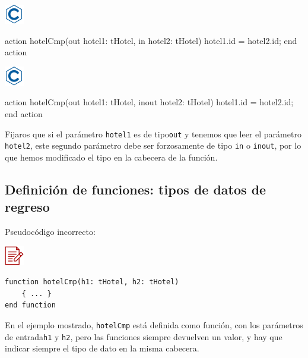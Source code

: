 \documentclass[
]{book}
\newenvironment{Shaded}{\begin{snugshade}}{\end{snugshade}}
\newcommand{\NormalTok}[1]{#1}
\begin{document}
\includegraphics{./img/c.png}

\begin{Shaded}
\begin{Highlighting}[]
\NormalTok{action hotelCmp(out hotel1: tHotel, in hotel2: tHotel)}
\NormalTok{    hotel1.id = hotel2.id;}
\NormalTok{end action}
\end{Highlighting}
\end{Shaded}

\includegraphics{./img/c.png}

\begin{Shaded}
\begin{Highlighting}[]
\NormalTok{action hotelCmp(out hotel1: tHotel, inout hotel2: tHotel)}
\NormalTok{    hotel1.id = hotel2.id;}
\NormalTok{end action}
\end{Highlighting}
\end{Shaded}

Fijaros que si el parámetro \texttt{hotel1} es de tipo\texttt{out} y tenemos que leer el parámetro \texttt{hotel2}, este segundo parámetro debe ser forzosamente de tipo \texttt{in} o \texttt{inout}, por lo que hemos modificado el tipo en la cabecera de la función.

\hypertarget{definiciuxf3n-de-funciones-tipos-de-datos-de-regreso}{%
\subsection{Definición de funciones: tipos de datos de regreso}\label{definiciuxf3n-de-funciones-tipos-de-datos-de-regreso}}

Pseudocódigo incorrecto:

\includegraphics{./img/alg_err.png}

\begin{verbatim}
function hotelCmp(h1: tHotel, h2: tHotel)
    { ... }
end function
\end{verbatim}

En el ejemplo mostrado, \texttt{hotelCmp} está definida como función, con los parámetros de entrada\texttt{h1} y \texttt{h2}, pero las funciones siempre devuelven un valor, y hay que indicar siempre el tipo de dato en la misma cabecera.
\end{document}
